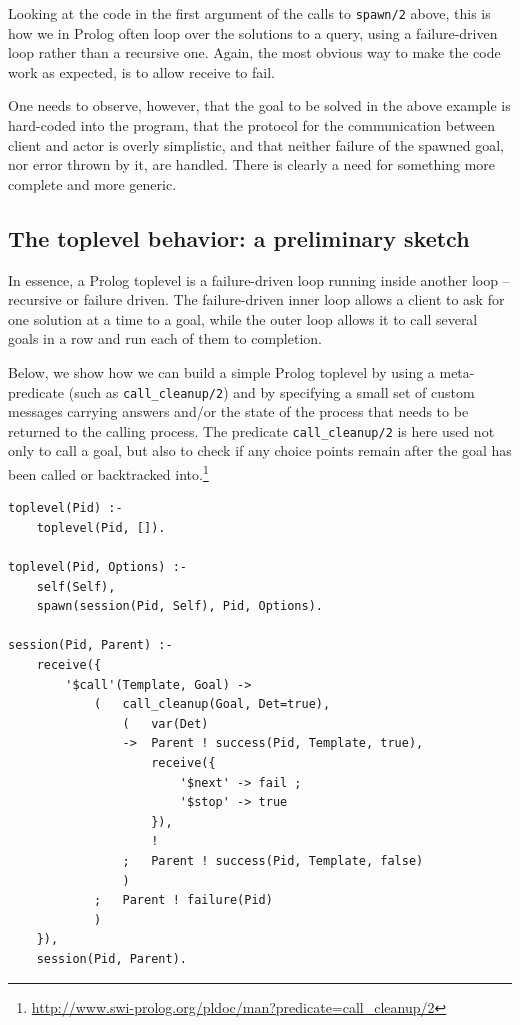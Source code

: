Looking at the code in the first argument of the calls to \texttt{spawn/2} above, this is how we in Prolog often loop over the solutions to a query, using a failure-driven loop rather than a recursive one. Again, the most obvious way to make the code work as expected, is to allow receive to fail. 

One needs to observe, however, that the goal to be solved in the above example is hard-coded into the program, that the protocol for the communication between client and actor is overly simplistic, and that neither failure of the spawned goal, nor error thrown by it, are handled. There is clearly a need for something more complete and more generic.

\subsection{The toplevel behavior: a preliminary sketch}\label{sec:simple-toplevel}

In essence, a Prolog toplevel is a failure-driven loop running inside another loop -- recursive or failure driven. The failure-driven inner loop allows a client to ask for one solution at a time to a goal, while the outer loop allows it to call several goals in a row and run each of them to completion.

Below, we show how we can build a simple Prolog toplevel by using a meta-predicate (such as \texttt{call\_cleanup/2}) and by specifying a small set of custom messages carrying answers and/or the state of the process that needs to be returned to the calling process. The predicate \texttt{call\_cleanup/2} is here used not only to call a goal, but also to check if any choice points remain after the goal has been called or backtracked into.\footnote{\url{http://www.swi-prolog.org/pldoc/man?predicate=call\_cleanup/2}}

\begin{verbatim}
toplevel(Pid) :-
    toplevel(Pid, []).

toplevel(Pid, Options) :-
    self(Self),
    spawn(session(Pid, Self), Pid, Options).

session(Pid, Parent) :-
    receive({
        '$call'(Template, Goal) ->
            (   call_cleanup(Goal, Det=true), 
                (   var(Det)
                ->  Parent ! success(Pid, Template, true),
                    receive({
                        '$next' -> fail ;
                        '$stop' -> true
                    }),
                    !
                ;   Parent ! success(Pid, Template, false)
                )
            ;   Parent ! failure(Pid)
            )       
    }),
    session(Pid, Parent).
\end{verbatim} 

